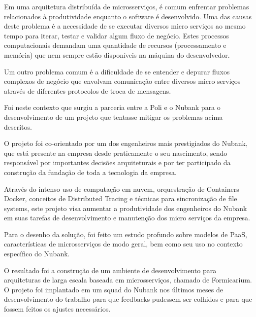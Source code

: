 \documentclass[]{politex}
\begin{document}
\begin{resumo}
	Em uma arquitetura distribuída de microsserviços, é comum enfrentar problemas relacionados à produtividade enquanto o software é desenvolvido. Uma das causas deste problema é a necessidade de se executar diversos micro serviços ao mesmo tempo para iterar, testar e validar algum fluxo de negócio. Estes processos computacionais demandam uma quantidade de recursos (processamento e memória) que nem sempre estão disponíveis na máquina do desenvolvedor.
	
	Um outro problema comum é a dificuldade de se entender e depurar fluxos complexos de negócio que envolvam comunicação entre diversos micro serviços através de diferentes protocolos de troca de mensagens.
	
	Foi neste contexto que surgiu a parceria entre a Poli e o Nubank para o desenvolvimento de um projeto que tentasse mitigar os problemas acima descritos.
	
	
	O projeto foi co-orientado por um dos engenheiros mais prestigiados do Nubank, que está presente na empresa desde praticamente o seu nascimento, sendo responsável por importantes decisões arquiteturais e por ter participado da construção da fundação de toda a tecnologia da empresa.
	
	Através do intenso uso de computação em nuvem, orquestração de Containers Docker, conceitos de Distributed Tracing e técnicas para sincronização de file systems, este projeto visa aumentar a produtividade dos engenheiros do Nubank em suas tarefas de desenvolvimento e manutenção dos micro serviços da empresa.
	
	Para o desenho da solução, foi feito um estudo profundo sobre modelos de PaaS, características de microsserviços de modo geral, bem como seu uso no contexto específico do Nubank. 
	
	O resultado foi a construção de um ambiente de desenvolvimento para arquiteturas de larga escala baseada em microsserviços, chamado de Formicarium. O projeto foi implantado em um squad do Nubank nos últimos meses de desenvolvimento do trabalho para que feedbacks pudessem ser colhidos e para que fossem feitos os ajustes necessários.
	

\end{resumo}
\end{document}
